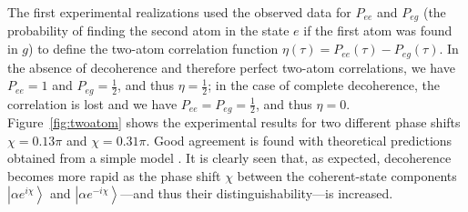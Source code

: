 \documentclass[3p,sort&compress,12pt]{elsarticle}
\newcommand{\ket}[1]{\left\vert{#1}\right\rangle}
\newcommand{\E}{\ensuremath{e}}
\newcommand{\I}{\ensuremath{i}}
\begin{document}
The first experimental realizations \cite{Brune:1996:om,Maitre:1997:tv} used the observed data for $P_{ee}$ and $P_{eg}$ (the probability of finding the second atom in the state $e$ if the first atom was found in $g$) to define the two-atom correlation function $\eta(\tau)=P_{ee}(\tau)-P_{eg}(\tau)$. In the absence of decoherence and therefore perfect two-atom correlations, we have $P_{ee}=1$ and $P_{eg}=\frac{1}{2}$, and thus $\eta=\frac{1}{2}$; in the case of complete decoherence, the correlation is lost and we have $P_{ee}=P_{eg}=\frac{1}{2}$, and thus $\eta=0$. Figure~\ref{fig:twoatom} shows the experimental results for two different phase shifts $\chi=0.13\pi$ and $\chi=0.31\pi$. Good agreement is found with theoretical predictions obtained from a simple model \cite{Davidovich:1996:sa,Maitre:1997:tv}. It is clearly seen that, as expected, decoherence becomes more rapid as the phase shift $\chi$ between the coherent-state components $\ket{\alpha \E^{\I \chi}}$ and $\ket{\alpha \E^{-\I \chi}}$---and thus their distinguishability---is increased. 
\end{document}
